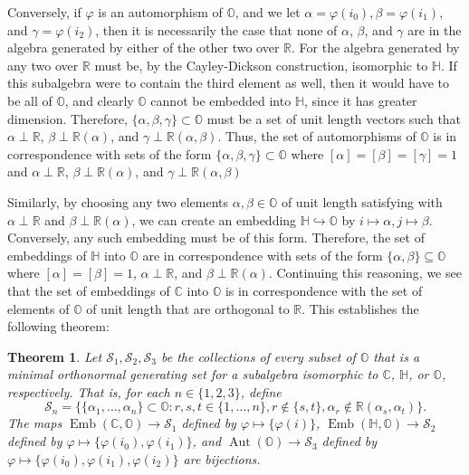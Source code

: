 \documentclass[10pt]{amsart}
\renewcommand{\S}{\mathcal{S}}
\newcommand{\R}{\mathbb{R}}
\newcommand{\C}{\mathbb{C}}
\renewcommand{\H}{\mathbb{H}}
\renewcommand{\O}{\mathbb{O}}
\DeclareMathOperator*{\Aut}{Aut}
\DeclareMathOperator*{\Emb}{Emb}
\newcommand{\norm}[1]{\left[#1\right]}
\newtheorem{thm}{Theorem}
\begin{document}
Conversely, if $\varphi$ is an automorphism of $\O$, and we let $\alpha = \varphi(i_0), \beta = \varphi(i_1)$, and $\gamma = \varphi(i_2)$, then it is necessarily the case that none of $\alpha$, $\beta$, and $\gamma$ are in the algebra generated by either of the other two over $\R$.  For the algebra generated by any two over $\R$ must be, by the Cayley-Dickson construction, isomorphic to $\H$.  If this subalgebra were to contain the third element as well, then it would have to be all of $\O$, and clearly $\O$ cannot be embedded into $\H$, since it has greater dimension.  Therefore, $\{\alpha, \beta, \gamma\} \subset \O$ must be a set of unit length vectors such that $\alpha \perp \R$, $\beta \perp \R(\alpha)$, and $\gamma \perp \R(\alpha,\beta)$.  Thus, the set of automorphisms of $\O$ is in correspondence with sets of the form $\{\alpha, \beta, \gamma\} \subset \O$ where $\norm{\alpha} = \norm{\beta} = \norm{\gamma} = 1$ and $\alpha \perp \R$, $\beta \perp \R(\alpha)$, and $\gamma \perp \R(\alpha,\beta)$

Similarly, by choosing any two elements $\alpha, \beta \in \O$ of unit length satisfying with $\alpha \perp \R$ and $\beta \perp \R(\alpha)$, we can create an embedding $\H \hookrightarrow \O$ by $i \mapsto \alpha, j \mapsto \beta$.  Conversely, any such embedding must be of this form.  Therefore, the set of embeddings of $\H$ into $\O$ are in correspondence with sets of the form $\{\alpha, \beta\} \subseteq \O$ where $\norm{\alpha} = \norm{\beta} = 1$, $\alpha \perp \R$, and $\beta \perp \R(\alpha)$.   Continuing this reasoning, we see that the set of embeddings of $\C$ into $\O$ is in correspondence with the set of elements of $\O$ of unit length that are orthogonal to $\R$.  This establishes the following theorem:

\begin{thm} \label{thm:autom}
\normalfont
Let $\S_1, \S_2, \S_3$ be the collections of every subset of $\O$ that is a minimal orthonormal generating set for a subalgebra isomorphic to $\C$, $\H$, or $\O$, respectively.  That is, for each $n \in \{1,2,3\}$, define
$$
\mathcal{S}_n = \{
\{\alpha_1,\dots,\alpha_n\} \subset \O : r,s,t \in \{1,\dots,n\}, r \not \in \{s,t\}, \alpha_r \not \in \R(\alpha_s,\alpha_t)\}.
$$
The maps $\Emb(\C, \O) \rightarrow \mathcal{S}_1$ defined by $\varphi \mapsto \{\varphi(i)\}$, $\Emb(\H,\O) \rightarrow \mathcal{S}_2$ defined by $\varphi \mapsto \{\varphi(i_0), \varphi(i_1)\}$, and $\Aut(\O) \rightarrow \mathcal{S}_3$ defined by $\varphi \mapsto \{\varphi(i_0),\varphi(i_1),\varphi(i_2)\}$ are bijections.
\end{thm}
\end{document}
